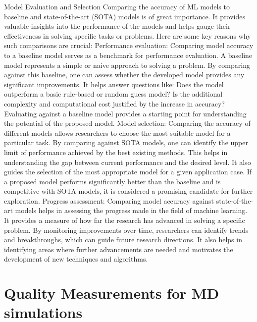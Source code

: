 \documentclass[9pt,bestpractices]{livecoms}
\begin{document}
Model Evaluation and Selection
	Comparing the accuracy of ML models to baseline and state-of-the-art (SOTA) models is of great importance. It provides valuable insights into the performance of the models and helps gauge their effectiveness in solving specific tasks or problems. Here are some key reasons why such comparisons are crucial:
Performance evaluation: Comparing model accuracy to a baseline model serves as a benchmark for performance evaluation. A baseline model represents a simple or naive approach to solving a problem. By comparing against this baseline, one can assess whether the developed model provides any significant improvements. It helps answer questions like: Does the model outperform a basic rule-based or random guess model? Is the additional complexity and computational cost justified by the increase in accuracy? Evaluating against a baseline model provides a starting point for understanding the potential of the proposed model.
Model selection: Comparing the accuracy of different models allows researchers to choose the most suitable model for a particular task. By comparing against SOTA models, one can identify the upper limit of performance achieved by the best existing methods. This helps in understanding the gap between current performance and the desired level. It also guides the selection of the most appropriate model for a given application case. If a proposed model performs significantly better than the baseline and is competitive with SOTA models, it is considered a promising candidate for further exploration.
Progress assessment: Comparing model accuracy against state-of-the-art models helps in assessing the progress made in the field of machine learning. It provides a measure of how far the research has advanced in solving a specific problem. By monitoring improvements over time, researchers can identify trends and breakthroughs, which can guide future research directions. It also helps in identifying areas where further advancements are needed and motivates the development of new techniques and algorithms.

\section{Quality Measurements for MD simulations}
\end{document}

